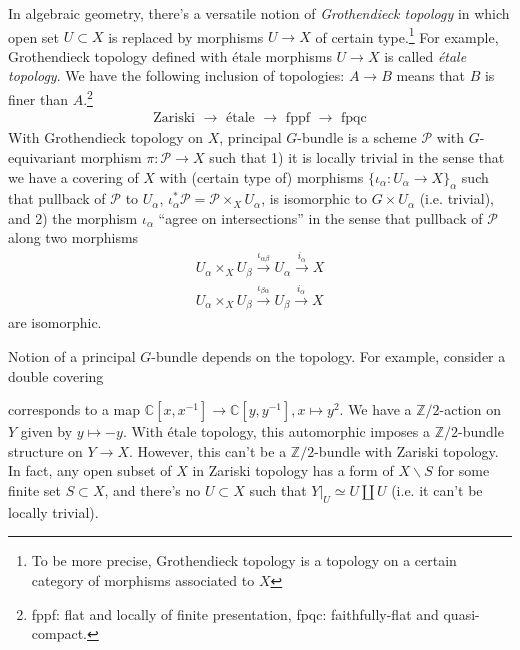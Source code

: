 In algebraic geometry, there's a versatile notion of \emph{Grothendieck topology}
in which open set $U\subset X$ is replaced by morphisms $U \to X$ of certain type.\footnote{To be more precise, Grothendieck topology is a topology
on a certain category of morphisms associated to $X$}
For example, Grothendieck topology defined with \'etale morphisms $U \to X$ is called \emph{\'etale topology}.
We have the following inclusion of topologies: $A \rightarrow B$ means that $B$ is finer than $A$.\footnote{fppf: flat and locally of finite presentation, fpqc: faithfully-flat and quasi-compact.}
\begin{align*}
    \boxed{
        \text{Zariski $\rightarrow$ \'etale $\rightarrow$ fppf $\rightarrow$ fpqc}
    }
\end{align*}
With Grothendieck topology on $X$, principal $G$-bundle is a scheme $\mathcal{P}$ with $G$-equivariant morphism $\pi: \mathcal{P} \to X$
such that 1) it is locally trivial in the sense that we have a covering of $X$ with (certain type of) morphisms
$\{\iota_{\alpha}:U_{\alpha} \to X\}_{\alpha}$ such that pullback of $\mathcal{P}$ to $U_\alpha$, $\iota_{\alpha}^{*}\mathcal{P}=\mathcal{P}\times_{X} U_{\alpha}$, is 
isomorphic to $G \times U_{\alpha}$ (i.e. trivial), and 2) the morphism $\iota_{\alpha}$ ``agree on intersections'' in the sense that pullback of $\mathcal{P}$
along two morphisms
\begin{align*}
U_{\alpha} \times_X U_{\beta} \xrightarrow{\iota_{\alpha\beta}} U_{\alpha} \xrightarrow{i_{\alpha}} X \\
U_{\alpha} \times_X U_{\beta} \xrightarrow{\iota_{\beta\alpha}} U_{\beta} \xrightarrow{i_{\alpha}} X
\end{align*}
are isomorphic.

Notion of a principal $G$-bundle depends on the topology.
For example, consider a double covering 

\begin{center}
\end{center}
corresponds to a map $\mathbb{C}[x, x^{-1}] \to \mathbb{C}[y, y^{-1}], x \mapsto y^2$.
We have a $\mathbb{Z}/2$-action on $Y$ given by $y \mapsto -y$.
With \'etale topology, this automorphic imposes a $\mathbb{Z}/2$-bundle structure on $Y\to X$.
However, this can't be a $\mathbb{Z}/2$-bundle with Zariski topology.
In fact, any open subset of $X$ in Zariski topology has a form of $X \backslash S$ for some finite set $S \subset X$, 
and there's no $U\subset X$ such that $Y|_{U} \simeq U \coprod U$ (i.e. it can't be locally trivial).

